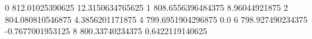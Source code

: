 0 812.01025390625 12.3150634765625
1 808.6556396484375 8.96044921875
2 804.080810546875 4.3856201171875
4 799.6951904296875 0.0
6 798.927490234375 -0.7677001953125
8 800.33740234375 0.6422119140625
